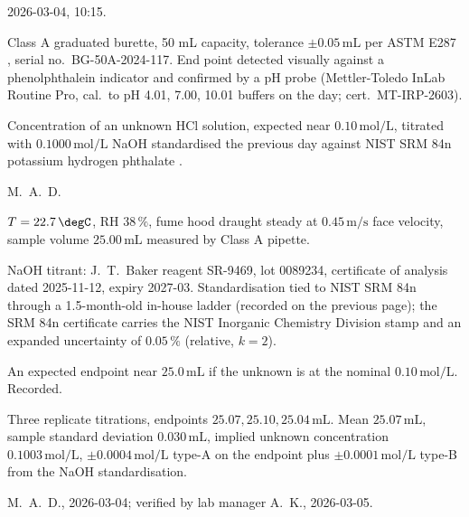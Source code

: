 \begin{description}[leftmargin=2em, itemsep=2pt]
  \item[Date / time.] 2026-03-04, 10{:}15.
  \item[Instrument.] Class A graduated burette, 50 \si{\milli\liter}
    capacity, tolerance $\pm 0.05 \,\si{\milli\liter}$ per ASTM E287
    \cite{std:ch01t3-astm-e287-2018}, serial no.\ BG-50A-2024-117. End
    point detected visually against a phenolphthalein indicator and
    confirmed by a pH probe (Mettler-Toledo InLab Routine Pro,
    cal.\ to pH 4.01, 7.00, 10.01 buffers on the day; cert.\
    MT-IRP-2603).
  \item[Measurand and setup.] Concentration of an unknown HCl
    solution, expected near $0.10 \,\si{\mol\per\liter}$, titrated
    with $0.1000 \,\si{\mol\per\liter}$ NaOH standardised the
    previous day against NIST SRM 84n potassium hydrogen phthalate
    \cite{std:ch01t3-nist-srm-84}.
  \item[Operator.] M.~A.~D.
  \item[Conditions.] $T = 22.7 \,\degC$, RH
    $38 \,\si{\percent}$, fume hood draught steady at
    $0.45 \,\si{\meter\per\second}$ face velocity, sample volume
    $25.00 \,\si{\milli\liter}$ measured by Class A pipette.
  \item[Provenance of reference.] NaOH titrant: J.~T.~Baker reagent
    SR-9469, lot 0089234, certificate of analysis dated 2025-11-12,
    expiry 2027-03. Standardisation tied to NIST SRM 84n through a
    1.5-month-old in-house ladder (recorded on the previous page);
    the SRM 84n certificate carries the NIST Inorganic Chemistry
    Division stamp and an expanded uncertainty of $0.05 \,\si{\percent}$
    (relative, $k=2$).
  \item[Estimate before reading.] An expected endpoint near
    $25.0 \,\si{\milli\liter}$ if the unknown is at the nominal
    $0.10 \,\si{\mol\per\liter}$. Recorded.
  \item[Reading.] Three replicate titrations, endpoints
    $25.07, 25.10, 25.04 \,\si{\milli\liter}$. Mean
    $25.07 \,\si{\milli\liter}$, sample standard deviation
    $0.030 \,\si{\milli\liter}$, implied unknown concentration
    $0.1003 \,\si{\mol\per\liter}$, $\pm 0.0004 \,\si{\mol\per\liter}$
    type-A on the endpoint plus $\pm 0.0001 \,\si{\mol\per\liter}$
    type-B from the NaOH standardisation.
  \item[Signature.] M.~A.~D., 2026-03-04; verified by lab manager
    A.~K., 2026-03-05.
\end{description}

